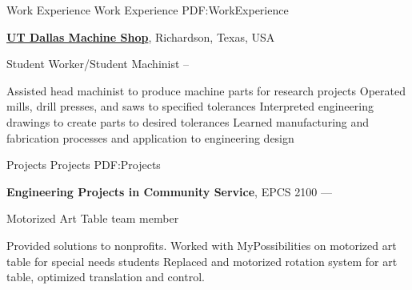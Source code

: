 \documentclass[letterpaper,MMMyyyy,nonstopmode]{simpleresumecv}
\begin{document}
\begin{Body}
\Section
{Work\newline
Experience}
{Work Experience}
{PDF:WorkExperience}

\Entry
\href{https://www.utdallas.edu/machineshop/}
{\textbf{UT Dallas Machine Shop}},
Richardson, Texas, USA

\SmallGap
\BulletItem
Student Worker/Student Machinist
\hfill
{} -- 
\begin{Detail}
\SubBulletItem
Assisted head machinist to produce machine parts for research projects
\SubBulletItem
Operated mills, drill presses, and saws to specified tolerances
\SubBulletItem
Interpreted engineering drawings to create parts to desired tolerances
\SubBulletItem
Learned manufacturing and fabrication processes and application to engineering design
\end{Detail}


\Section
{Projects}
{Projects}
{PDF:Projects}

\Entry
\textbf{Engineering Projects in Community Service}, EPCS 2100
\hfill
{}---
\par
\BulletItem
Motorized Art Table team member
\begin{Detail}
\SubBulletItem
Provided solutions to nonprofits. Worked with MyPossibilities on motorized art table for special needs students
\SubBulletItem
Replaced and motorized rotation system for art table, optimized translation and control.
\end{Detail}





\end{Body}
\end{document}
